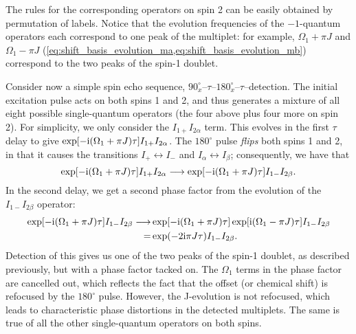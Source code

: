 The rules for the corresponding operators on spin 2 can be easily obtained by permutation of labels.
Notice that the evolution frequencies of the $-1$-quantum operators each correspond to one peak of the multiplet: for example, $\Omega_1 + \pi J$ and $\Omega_1 - \pi J$ (\cref{eq:shift_basis_evolution_ma,eq:shift_basis_evolution_mb}) correspond to the two peaks of the spin-1 doublet.

Consider now a simple spin echo sequence, $90^\circ_{x}$--$\tau$--$180^\circ_{x}$--$\tau$--detection.
The initial excitation pulse acts on both spins 1 and 2, and thus generates a mixture of all eight possible single-quantum operators (the four above plus four more on spin 2).
For simplicity, we only consider the $I_{1+}I_{2\alpha}$ term.
This evolves in the first $\tau$ delay to give $\exp[-\mathrm{i}(\Omega_1 + \pi J)\tau] I_{1+}I_{2\alpha}$.
The $180^\circ$ pulse \textit{flips} both spins 1 and 2, in that it causes the transitions $I_+ \leftrightarrow I_-$ and $I_\alpha \leftrightarrow I_\beta$; consequently, we have that
\begin{equation}
    \label{eq:spin_echo_1}
    \exp[-\mathrm{i}(\Omega_1 + \pi J)\tau] I_{1+}I_{2\alpha} \longrightarrow \exp[-\mathrm{i}(\Omega_1 + \pi J)\tau] I_{1-}I_{2\beta}.
\end{equation}
In the second delay, we get a second phase factor from the evolution of the $I_{1-}I_{2\beta}$ operator:
\begin{align}
    \label{eq:spin_echo_2}
    \exp[-\mathrm{i}(\Omega_1 + \pi J)\tau] I_{1-}I_{2\beta} \longrightarrow
    &\exp[-\mathrm{i}(\Omega_1 + \pi J)\tau] \exp[\mathrm{i}(\Omega_1 - \pi J)\tau] I_{1-}I_{2\beta} \notag \\
    = &\exp(-2\mathrm{i} \pi J\tau) I_{1-}I_{2\beta}.
\end{align}
Detection of this gives us one of the two peaks of the spin-1 doublet, as described previously, but with a phase factor tacked on.
The $\Omega_1$ terms in the phase factor are cancelled out, which reflects the fact that the offset (or chemical shift) is refocused by the $180^\circ$ pulse.
However, the J-evolution is not refocused, which leads to characteristic phase distortions in the detected multiplets.
The same is true of all the other single-quantum operators on both spins.

